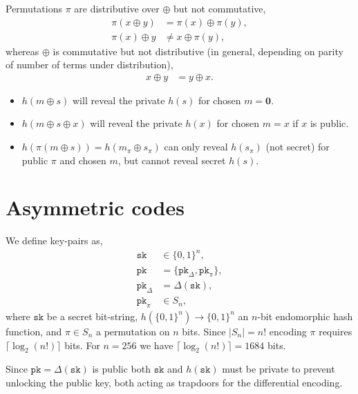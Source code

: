 \documentclass[twocolumn, aps, amsmath, amssymb, nofootinbib, superscriptaddress, longbibliography, doublefloatfix, table-of-contents, eqsecnum, rmp]{revtex4-2}
\begin{document}
Permutations $\pi$ are distributive over $\oplus$ but not commutative,
\begin{align}
	\pi(x\oplus y) &= \pi(x) \oplus \pi(y),\nonumber\\
	\pi(x) \oplus y &\neq x \oplus \pi(y),
\end{align}
whereas $\oplus$ is commutative but not distributive (in general, depending on parity of number of terms under distribution),
\begin{align}
	x\oplus y &= y \oplus x.
\end{align}

\begin{itemize}
	\item $h(m\oplus s)$ will reveal the private $h(s)$ for chosen $m=\mathbf{0}$.
	\item $h(m\oplus s \oplus x)$ will reveal the private $h(x)$ for chosen $m=x$ if $x$ is public.
	\item $h(\pi(m\oplus s)) = h(m_\pi \oplus s_\pi)$ can only reveal $h(s_\pi)$ (not secret) for public $\pi$ and chosen $m$, but cannot reveal secret $h(s)$.
\end{itemize}

\section{Asymmetric codes}

We define key-pairs as,
\begin{align}
	\mathtt{sk} &\in \{0,1\}^n, \nonumber\\
	\mathtt{pk} &= \{\mathtt{pk}_\Delta,\mathtt{pk}_\pi\},\nonumber\\
	\mathtt{pk}_\Delta &= \Delta(\mathtt{sk}),\nonumber\\
	\mathtt{pk}_\pi &\in S_n,
\end{align}
where $\mathtt{sk}$ be a secret bit-string, $h(\{0,1\}^n)\to\{0,1\}^n$ an $n$-bit endomorphic hash function, and $\pi\in S_n$ a permutation on $n$ bits. Since $|S_n|=n!$ encoding $\pi$ requires $\lceil\log_2(n!)\rceil$ bits. For $n=256$ we have $\lceil\log_2(n!)\rceil = 1684$ bits.

Since $\mathtt{pk} = \Delta(\mathtt{sk})$ is public both $\mathtt{sk}$ and $h(\mathtt{sk})$ must be private to prevent unlocking the public key, both acting as trapdoors for the differential encoding.
\end{document}
